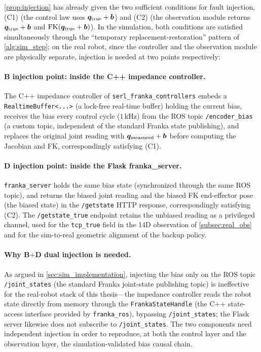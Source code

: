 \cref{prop:injection} has already given the two sufficient conditions for fault injection, (C1) (the control law uses $\bm{q}_\text{true} + \bm{b}$) and (C2) (the observation module returns $\bm{q}_\text{true} + \bm{b}$ and $\text{FK}(\bm{q}_\text{true} + \bm{b})$). In the simulation, both conditions are satisfied simultaneously through the ``temporary replacement-restoration'' pattern of \cref{alg:sim_step}; on the real robot, since the controller and the observation module are physically separate, injection is needed at two points respectively:

\paragraph{B injection point: inside the C++ impedance controller.} The C++ impedance controller of \texttt{serl\_franka\_controllers} embeds a \texttt{RealtimeBuffer<...>} (a lock-free real-time buffer) holding the current bias, receives the bias every control cycle ($1$\,kHz) from the ROS topic \texttt{/encoder\_bias} (a custom topic, independent of the standard Franka state publishing), and replaces the original joint reading with $\bm{q}_\text{measured} + \bm{b}$ before computing the Jacobian and FK, correspondingly satisfying (C1).

\paragraph{D injection point: inside the Flask franka\_server.} \texttt{franka\_server} holds the same bias state (synchronized through the same ROS topic), and returns the biased joint reading and the biased FK end-effector pose (the biased state) in the \texttt{/getstate} HTTP response, correspondingly satisfying (C2). The \texttt{/getstate\_true} endpoint retains the unbiased reading as a privileged channel, used for the \texttt{tcp\_true} field in the 14D observation of \cref{subsec:real_obs} and for the sim-to-real geometric alignment of the backup policy.

\paragraph{Why B$+$D dual injection is needed.} As argued in \cref{sec:sim_implementation}, injecting the bias only on the ROS topic \texttt{/joint\_states} (the standard Franka joint-state publishing topic) is ineffective for the real-robot stack of this thesis---the impedance controller reads the robot state directly from memory through the \texttt{FrankaStateHandle} (the C++ state-access interface provided by \texttt{franka\_ros}), bypassing \texttt{/joint\_states}; the Flask server likewise does not subscribe to \texttt{/joint\_states}. The two components need independent injection in order to reproduce, at both the control layer and the observation layer, the simulation-validated bias causal chain.

